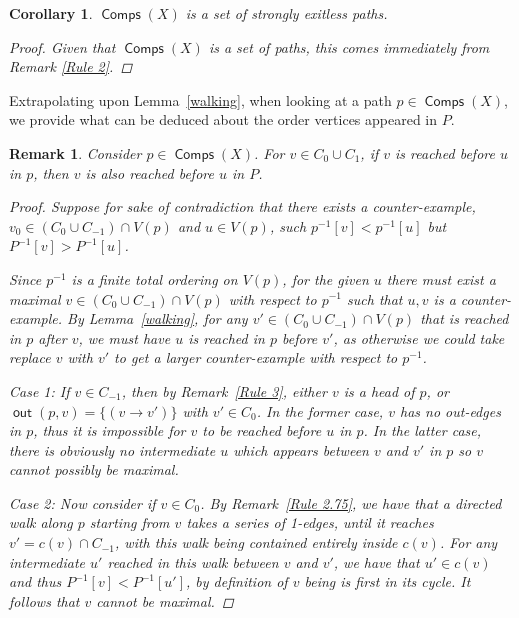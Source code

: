 \documentclass{article}
\newtheorem{rmk}[result]{Remark}
\newtheorem{cor}[result]{Corollary}
\theoremstyle{definition}
\DeclareMathOperator{\out}{\bm{\mathsf{out}}}
\DeclareMathOperator{\Comp}{\bm{\mathsf{Comps}}}
\begin{document}
\begin{cor} \label{exitless rule} $\Comp(X)$ is a set of strongly exitless paths.

\begin{proof} Given that $\Comp(X)$ is a set of paths, this comes immediately from Remark \ref{Rule 2}.\end{proof} 
\end{cor}

Extrapolating upon Lemma~\ref{walking}, when looking at a path $p \in \Comp(X)$, we provide what can be deduced about the order vertices appeared in $P$.   

\begin{rmk} \label{ordering rule}Consider $p \in \Comp(X)$. For $v \in C_0\cup C_1$, if $v$ is reached before $u$ in $p$, then $v$ is also reached before $u$ in $P$.

\begin{proof}
Suppose for sake of contradiction that there exists a counter-example, $v_0 \in (C_0 \cup C_{-1})\cap V(p)$ and $u \in V(p)$, such $p^{-1}[v]<p^{-1}[u]$ but $P^{-1}[v]>P^{-1}[u]$. 

Since $p^{-1}$ is a finite total ordering on $V(p)$, for the given $u$ there must exist a maximal $v \in (C_0 \cup C_{-1})\cap V(p)$ with respect to $p^{-1}$ such that $u,v$ is a counter-example. By Lemma~\ref{walking}, for any $v'\in (C_0 \cup C_{-1})\cap V(p)$ that is reached in $p$ after $v$, we must have $u$ is reached in $p$ before $v'$, as otherwise we could take replace $v$ with $v'$ to get a larger counter-example with respect to $p^{-1}$.

\vspace{0.75em}

Case 1: If $v \in C_{-1}$, then by Remark~\ref{Rule 3}, either $v$ is a head of $p$, or $\out(p,v) = \{(v \to v')\}$ with $v' \in C_0$. In the former case, $v$ has no out-edges in $p$, thus it is impossible for $v$ to be reached before $u$ in $p$. In the latter case, there is obviously no intermediate $u$ which appears between $v$ and $v'$ in $p$ so $v$ cannot possibly be maximal.
 
 
Case 2: Now consider if $v \in C_0$. By Remark~\ref{Rule 2.75}, we have that a directed walk along $p$ starting from $v$ takes a series of 1-edges, until it reaches $v' = c(v) \cap C_{-1}$, with this walk being contained entirely inside $c(v)$. For any intermediate $u'$ reached in this walk between $v$ and $v'$, we have that $u' \in c(v)$ and thus $P^{-1}[v] <P^{-1}[u'] $, by definition of $v$ being is first in its cycle. It follows that $v$ cannot be maximal.


\end{proof}
\end{rmk}
\end{document}
